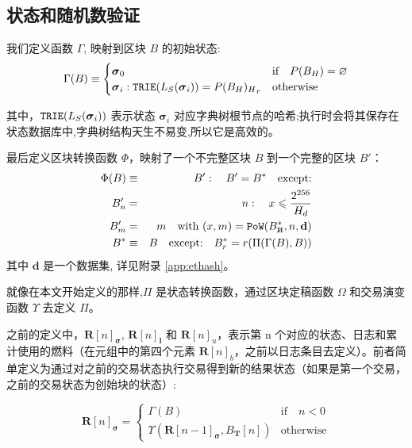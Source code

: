 \documentclass[9pt,oneside]{amsart}
\newcommand{\hcancel}[1]{%
    \tikz[baseline=(tocancel.base)]{
        \node[inner sep=0pt,outer sep=0pt] (tocancel) {#1};
        \draw[black] (tocancel.south west) -- (tocancel.north east);
    }%
}%
\begin{document}
\begin{multicols}{2}
\subsection{状态和随机数验证}\label{sec:statenoncevalidation}

我们定义函数 $\Gamma$, 映射到区块 $B$ 的初始状态:
\begin{equation}
\Gamma(B) \equiv \begin{cases}
\boldsymbol{\sigma}_0 & \text{if} \quad P(B_H) = \varnothing \\
\boldsymbol{\sigma}_i: \mathtt{\small TRIE}(L_S(\boldsymbol{\sigma}_i)) = {P(B_H)_H}_r & \text{otherwise}
\end{cases}
\end{equation}

其中，$\mathtt{\small TRIE}(L_S(\boldsymbol{\sigma}_i))$ 表示状态 $\boldsymbol{\sigma}_i$ 对应字典树根节点的哈希;执行时会将其保存在状态数据库中,字典树结构天生不易变,所以它是高效的。

最后定义区块转换函数 $\Phi$，映射了一个不完整区块 $B$ 到一个完整的区块 $B'$：
\begin{eqnarray}
\Phi(B) & \equiv & B': \quad B' = B^* \quad \text{except:} \\
B'_n & = & n: \quad x \leqslant \frac{2^{256}}{H_d} \\
B'_m & = & m \quad \text{with } (x, m) = \mathtt{PoW}(B^*_{\hcancel{n}}, n, \mathbf{d}) \\
B^* & \equiv & B \quad \text{except:} \quad B^*_r = r(\Pi(\Gamma(B), B))
\end{eqnarray}
其中 $\mathbf{d}$ 是一个数据集, 详见附录 \ref{app:ethash}。

就像在本文开始定义的那样,$\Pi$ 是状态转换函数，通过区块定稿函数 $\Omega$ 和交易演变函数 $\Upsilon$ 去定义 $\Pi$。

之前的定义中，$\mathbf{R}[n]_{\boldsymbol{\sigma}}$, $\mathbf{R}[n]_\mathbf{l}$ 和 $\mathbf{R}[n]_u$，表示第 n 个对应的状态、日志和累计使用的燃料（在元组中的第四个元素 $\mathbf{R}[n]_b$，之前以日志条目去定义）。前者简单定义为通过对之前的交易状态执行交易得到新的结果状态（如果是第一个交易，之前的交易状态为创始块的状态）:

\begin{equation}
\mathbf{R}[n]_{\boldsymbol{\sigma}} = \begin{cases} \Gamma(B) & \text{if} \quad n < 0 \\ \Upsilon(\mathbf{R}[n - 1]_{\boldsymbol{\sigma}}, B_\mathbf{T}[n]) & \text{otherwise} \end{cases}
\end{equation}


\end{multicols}
\end{document}
